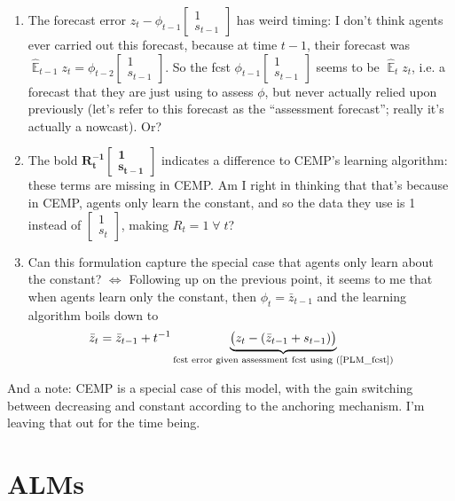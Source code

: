 \documentclass[11pt]{article}
\renewcommand{\[}{\begin{equation}}
\renewcommand{\]}{\end{equation}}
\DeclareMathOperator{\E}{\mathbb{E}}
\begin{document}
\begin{enumerate}
\item The forecast error $z_{t} - \phi_{t-1} \begin{bmatrix} 1 \\ s_{t-1} \end{bmatrix} $ has weird timing: I don't think agents ever carried out this forecast, because at time $t-1$, their forecast was $\hat{\E}_{t-1}z_{t}=\phi_{t-2}\begin{bmatrix} 1 \\ s_{t-1} \end{bmatrix}$. So the fcst $\phi_{t-1} \begin{bmatrix} 1 \\ s_{t-1} \end{bmatrix} $  seems to be $\hat{\E}_{t}z_{t}$, i.e. a forecast that they are just using to assess $\phi$, but never actually relied upon previously (let's refer to this forecast as the ``assessment forecast''; really it's actually a nowcast). Or?
\item The bold $\mathbf{R_t^{-1}}\begin{bmatrix} \mathbf{1} \\ \mathbf{s_{t-1}} \end{bmatrix}$ indicates a difference to CEMP's learning algorithm: these terms are missing in CEMP. Am I right in thinking that that's because in CEMP, agents only learn the constant, and so the data they use is 1 instead of $\begin{bmatrix} 1 \\ s_{t} \end{bmatrix}$, making $R_t = 1 \; \forall \;t$?
\item Can this formulation capture the special case that agents only learn about the constant? $\Leftrightarrow$ Following up on the previous point, it seems to me that when agents learn only the constant, then $\phi_t = \bar{z}_{t-1}$ and the learning algorithm boils down to
\begin{equation}
\bar{z}_{t} = \bar{z}_{t-1} +t^{-1}\underbrace{\big(z_{t} -(\bar{z}_{t-1}+s_{t-1}) \big)}_{\text{fcst error given assessment fcst using (\ref{PLM_fcst})} }
\end{equation}
\end{enumerate}
And a note: CEMP is a special case of this model, with the gain switching between decreasing and constant according to the anchoring mechanism. I'm leaving that out for the time being. 

\section{ALMs}
\end{document}
